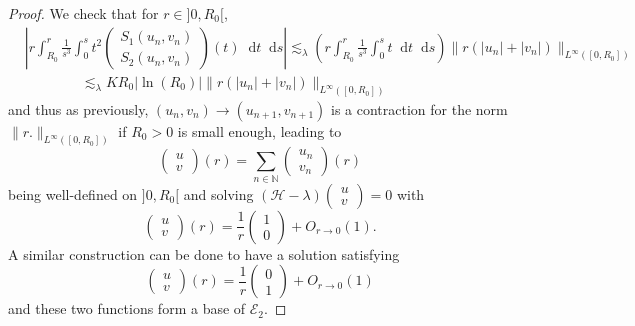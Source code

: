 \documentclass[11 pt]{amsart}
\theoremstyle{definition}
\theoremstyle{remark}
\numberwithin{equation}{section}
\newcommand{\dd}{\mathop{}\!\mathrm{d}}
\begin{document}
\begin{proof}
  We check that for $r \in] 0, R_0 [$,
  \begin{align*}
&\left| r \int_{R_0}^r \frac{1}{s^3} \int_0^s t^2
    \left(\begin{array}{c}
      S_1 (u_n, v_n)\\
      S_2 (u_n, v_n)
    \end{array}\right) (t) \dd t \dd s \right| \lesssim_{\lambda} \left( r \int_{R_0}^r \frac{1}{s^3} \int_0^s t \dd t
    \dd s \right) \| r (| u_n | + | v_n |) \|_{L^{\infty} ([0, R_0])}\\
    &\qquad \qquad \lesssim_{\lambda}  K R_0 | \ln (R_0) | \| r (| u_n | + | v_n |)
    \|_{L^{\infty} ([0, R_0])}
  \end{align*}
  and thus as previously, $(u_n, v_n) \rightarrow (u_{n + 1}, v_{n + 1})$ is a
  contraction for the norm $\| r. \|_{L^{\infty} ([0, R_0])}$ if $R_0 > 0$ is
  small enough, leading to
  \[ \left(\begin{array}{c}
       u\\
       v
     \end{array}\right) (r) = \sum_{n \in \mathbb{N}} \left(\begin{array}{c}
       u_n\\
       v_n
     \end{array}\right) (r) \]
  being well-defined on $] 0, R_0 [$ and solving $(\mathcal{H}- \lambda)
  \left(\begin{array}{c}
    u\\
    v
  \end{array}\right) = 0$ with
  \[ \left(\begin{array}{c}
       u\\
       v
     \end{array}\right) (r) = \frac{1}{r} \left(\begin{array}{c}
       1\\
       0
     \end{array}\right) + O_{r \rightarrow 0} (1) . \]
  A similar construction can be done to have a solution satisfying
  \[ \left(\begin{array}{c}
       u\\
       v
     \end{array}\right) (r) = \frac{1}{r} \left(\begin{array}{c}
       0\\
       1
     \end{array}\right) + O_{r \rightarrow 0} (1) \]
  and these two functions form a base of $\mathcal{E}_2$.
\end{proof}
\end{document}
